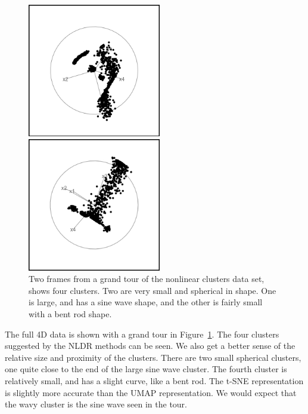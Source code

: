 \documentclass[
  letterpaper,
]{krantz}
\begin{document}
\begin{figure}

\begin{minipage}{0.50\linewidth}
\includegraphics[width=2.29167in,height=\textheight]{images/clusters_nonlin_60.png}\end{minipage}%
%
\begin{minipage}{0.50\linewidth}
\includegraphics[width=2.29167in,height=\textheight]{images/clusters_nonlin_233.png}\end{minipage}%

\caption{\label{fig-clusters-nonlin-pdf}Two frames from a grand tour of
the nonlinear clusters data set, shows four clusters. Two are very small
and spherical in shape. One is large, and has a sine wave shape, and the
other is fairly small with a bent rod shape. }

\end{figure}%

The full 4D data is shown with a grand tour in
Figure~\ref{fig-clusters-nonlin-pdf}. The four clusters suggested by the
NLDR methods can be seen. We also get a better sense of the relative
size and proximity of the clusters. There are two small spherical
clusters, one quite close to the end of the large sine wave cluster. The
fourth cluster is relatively small, and has a slight curve, like a bent
rod. The t-SNE representation is slightly more accurate than the UMAP
representation. We would expect that the wavy cluster is the sine wave
seen in the tour.
\end{document}
